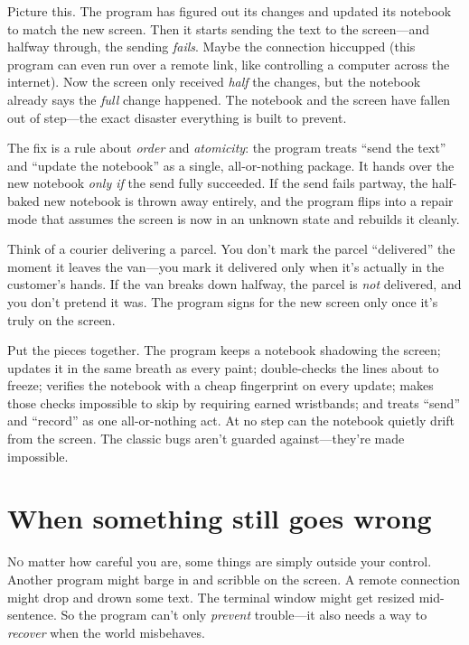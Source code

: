 \documentclass[11pt,twoside]{book}
\begin{document}
Picture this. The program has figured out its changes and updated its
notebook to match the new screen. Then it starts sending the text to the
screen---and halfway through, the sending \emph{fails}. Maybe the connection
hiccupped (this program can even run over a remote link, like controlling a
computer across the internet). Now the screen only received \emph{half} the
changes, but the notebook already says the \emph{full} change happened. The
notebook and the screen have fallen out of step---the exact disaster
everything is built to prevent.

The fix is a rule about \emph{order} and \emph{atomicity}: the program treats
``send the text'' and ``update the notebook'' as a single, all-or-nothing
package. It hands over the new notebook \emph{only if} the send fully
succeeded. If the send fails partway, the half-baked new notebook is thrown
away entirely, and the program flips into a repair mode that assumes the
screen is now in an unknown state and rebuilds it cleanly.

\begin{pic}
Think of a courier delivering a parcel. You don't mark the parcel
``delivered'' the moment it leaves the van---you mark it delivered only when it's
actually in the customer's hands. If the van breaks down halfway, the parcel is
\emph{not} delivered, and you don't pretend it was. The program signs for the
new screen only once it's truly on the screen.
\end{pic}

\begin{insight}
Put the pieces together. The program keeps a notebook shadowing the screen;
updates it in the same breath as every paint; double-checks the lines about to
freeze; verifies the notebook with a cheap fingerprint on every update; makes
those checks impossible to skip by requiring earned wristbands; and treats
``send'' and ``record'' as one all-or-nothing act. At no step can the notebook
quietly drift from the screen. The classic bugs aren't guarded against---they're
made impossible.
\end{insight}

\chapter{When something still goes wrong}
\lettrine{N}{o} matter how careful you are, some things are simply outside your
control. Another program might barge in and scribble on the screen. A remote
connection might drop and drown some text. The terminal window might get
resized mid-sentence. So the program can't only \emph{prevent} trouble---it
also needs a way to \emph{recover} when the world misbehaves.
\end{document}
